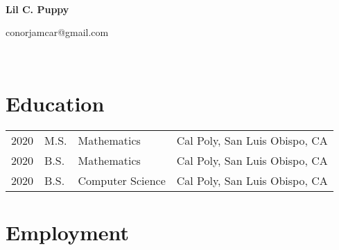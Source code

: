 \documentclass[11pt]{article}
\begin{document}
~
~

\begin{center}
  {
	\fontsize{1.5cm}{1.5cm}
        \textcolor{CalPolyGreen}{\textbf{Lil C. Puppy}}
  }
  ~

  conorjamcar@gmail.com

\end{center}

~
~


\section*{\textcolor{CalPolyGreen}{Education}}
\begin{tabular}{llll}
        2020    & M.S.  & Mathematics           & Cal Poly, San Luis Obispo, CA \\
        2020    & B.S.  & Mathematics           & Cal Poly, San Luis Obispo, CA \\
        2020    & B.S.  & Computer Science      & Cal Poly, San Luis Obispo, CA \\
\end{tabular}

\section*{\textcolor{CalPolyGreen}{Employment}}
\end{document}

